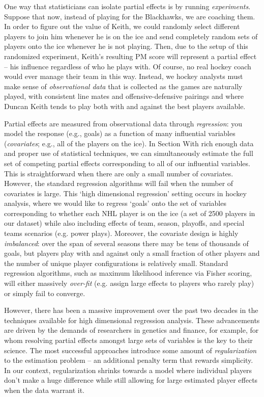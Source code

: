 One way that statisticians can isolate partial effects is by running
\textit{experiments}.  Suppose that now, instead of playing for the
Blackhawks, we are coaching them.  In order to figure out the value of Keith,
we could randomly select different players to join him whenever he is on the
ice and send completely random sets of players onto the ice whenever he is not
playing.  Then, due to the setup of this randomized experiment, Keith's
resulting PM score will represent a partial effect -- his influence regardless
of who he plays with.  Of course, no real hockey coach would ever manage their
team in this way.  Instead, we hockey analysts must make sense of
\textit{observational data} that is collected as the games are naturally
played, with consistent line mates and offensive-defensive pairings and where
Duncan Keith tends to play both with and against the best players available.

Partial effects are measured from observational data through
\textit{regression}: you model the response (e.g., goals) as a function of
many  influential variables (\textit{covariates}; e.g., all of the players on
the ice).  In Section With rich enough data and proper use of statistical techniques, we
can simultaneously estimate the full set of competing partial effects
corresponding to all of our influential variables.  This is straightforward
when there are only a small number of covariates.  However, the standard
regression algorithms will fail when the number of covariates is large. This
`high dimensional regression' setting occurs in hockey analysis, where we
would like to regress `goals' onto the set of variables corresponding to
whether each NHL player is on the ice (a set of 2500 players in our dataset)
while also including effects of team, season, playoffs, and special teams
scenarios (e.g. power plays).  Moreover, the covariate design is highly
\textit{imbalanced}: over the span of several seasons there may be  tens of thousands of goals, but players play with
and against only a small fraction of other players and the number of unique
player configurations is relatively small.  Standard regression algorithms,
such as maximum likelihood inference via Fisher scoring, will either massively
\textit{over-fit} (e.g. assign large effects to players who rarely play) or
simply fail to converge.

However, there has been a massive improvement over the past two decades in the
techniques available for high dimensional regression analysis.  These
advancements are driven by the demands of researchers in genetics and finance,
for example, for whom resolving partial effects amongst  large sets of
variables is the key to their science.  The most successful approaches
introduce some amount of \textit{regularization} to the estimation problem --
an additional penalty term that rewards simplicity.  In our context,
regularization shrinks towards a model where individual players don't make a
huge difference while still allowing for large estimated player effects when
the data warrant it.




